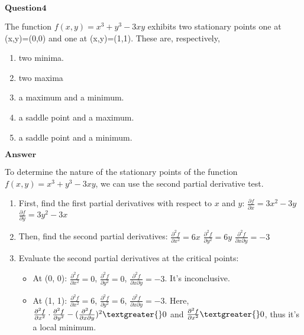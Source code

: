 \documentclass[11pt]{article}
\makeatletter
\providecommand{\tightlist}{%
      \setlength{\itemsep}{0pt}\setlength{\parskip}{0pt}}
\newcommand{\boxspacing}{\kern\kvtcb@left@rule\kern\kvtcb@boxsep}
\newcommand{\prompt}[4]{
        {\ttfamily\llap{{\color{#2}[#3]:\hspace{3pt}#4}}\vspace{-\baselineskip}}
    }
\makeatother
\begin{document}
    \begin{tcolorbox}[breakable, size=fbox, boxrule=1pt, pad at break*=1mm,colback=cellbackground, colframe=cellborder]
\prompt{In}{incolor}{ }{\boxspacing}
\begin{Verbatim}[commandchars=\\\{\}]

\end{Verbatim}
\end{tcolorbox}

    $\textbf{Question4}$

The function $f(x,y)=x^3+y^3-3xy$ exhibits two stationary points one
at (x,y)=(0,0) and one at (x,y)=(1,1). These are, respectively,

\begin{enumerate}
\def\labelenumi{\alph{enumi}.}
\item
  two minima.
\item
  two maxima
\item
  a maximum and a minimum.
\item
  a saddle point and a maximum.
\item
  a saddle point and a minimum.
\end{enumerate}

$\textbf{Answer}$

    To determine the nature of the stationary points of the function $ f(x,
y) = x^3 + y^3 - 3xy $, we can use the second partial derivative
test.

\begin{enumerate}
\def\labelenumi{\arabic{enumi}.}
\item
  First, find the first partial derivatives with respect to $ x $ and
  $ y $: $ \frac{\partial f}{\partial x} = 3x^2 - 3y $ $
  \frac{\partial f}{\partial y} = 3y^2 - 3x $
\item
  Then, find the second partial derivatives: $
  \frac{\partial^2 f}{\partial x^2} = 6x $ $
  \frac{\partial^2 f}{\partial y^2} = 6y $ $
  \frac{\partial^2 f}{\partial x \partial y} = -3 $
\item
  Evaluate the second partial derivatives at the critical points:

  \begin{itemize}
  \tightlist
  \item
    At (0, 0): $ \frac{\partial^2 f}{\partial x^2} = 0 $, $
    \frac{\partial^2 f}{\partial y^2} = 0 $, $
    \frac{\partial^2 f}{\partial x \partial y} = -3 $. It's
    inconclusive.
  \item
    At (1, 1): $ \frac{\partial^2 f}{\partial x^2} = 6 $, $
    \frac{\partial^2 f}{\partial y^2} = 6 $, $
    \frac{\partial^2 f}{\partial x \partial y} = -3 $. Here, $
    \frac{\partial^2 f}{\partial x^2}
    \cdot \frac{\partial^2 f}{\partial y^2} -
    (\frac{\partial^2 f}{\partial x \partial y})^2 \textgreater{} 0
    $ and $ \frac{\partial^2 f}{\partial x^2} \textgreater{} 0 $,
    thus it's a local minimum.
  \end{itemize}
\end{enumerate}
\end{document}
